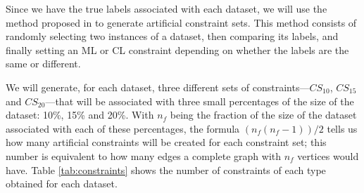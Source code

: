 Since we have the true labels associated with each dataset, we will use the method proposed in \cite{wagstaff2001constrained} to generate artificial constraint sets. This method consists of randomly selecting two instances of a dataset, then comparing its labels, and finally setting an \acs{ML} or \acs{CL} constraint depending on whether the labels are the same or different.

We will generate, for each dataset, three different sets of constraints---$CS_{10}$, $CS_{15}$ and $CS_{20}$---that will be associated with three small percentages of the size of the dataset: 10\%, 15\% and 20\%. With $n_f$ being the fraction of the size of the dataset associated with each of these percentages, the formula $(n_f(n_f-1))/2$ tells us how many artificial constraints will be created for each constraint set; this number is equivalent to how many edges a complete graph with $n_f$ vertices would have. Table \ref{tab:constraints} shows the number of constraints of each type obtained for each dataset.

